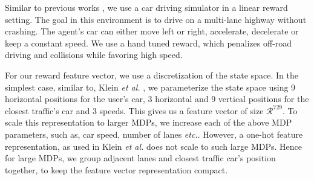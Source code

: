 \documentclass{article}
\def\MSHangBox#1{%
\begin{minipage}[t]{\textwidth}%
\begin{tabbing} %
~\\[-\baselineskip] %
#1 %
\end{tabbing}%
\end{minipage}} %
\begin{document}


Similar to previous works \cite{abbeel2004apprenticeship, klein2012inverse}, we use a car driving simulator in a linear reward setting. The goal in this environment is to drive on a multi-lane highway without crashing. The agent's car can either move left or right, accelerate, decelerate or keep a constant speed. We use a hand tuned reward, which penalizes off-road driving and collisions while favoring high speed. 

For our reward feature vector, we use a discretization of the state space. In the simplest case, similar to, Klein \emph{et al.} , we parameterize the state space using 9 horizontal positions for the user's car, 3 horizontal and 9 vertical positions for the closest traffic's car and 3 speeds. This gives us a feature vector of size $\mathcal{R}^{729}$. To scale this representation to larger MDPs, we increase each of the above MDP parameters, such as, car speed, number of lanes \emph{etc.}. However, a one-hot feature representation, as used in Klein \emph{et al.} does not scale to such large MDPs. Hence for large MDPs, we group adjacent lanes and closest traffic car's position together, to keep the feature vector representation compact.
\end{document}
